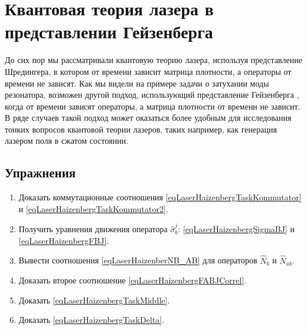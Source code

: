 \chapter{Квантовая теория лазера в представлении Гейзенберга}
\label{chLaser2}

До сих пор мы рассматривали квантовую теорию лазера, используя
представление Шредингера, в котором от времени зависит матрица
плотности, а операторы от времени не зависят. Как мы видели на примере
задачи о затухании моды резонатора, возможен другой подход,
использующий представление Гейзенберга
\cite{bScullyQuantumOptics2003}, 
когда от времени зависят
операторы, а матрица плотности 
от времени не зависит. В ряде случаев
такой подход может оказаться более удобным для исследования тонких
вопросов квантовой теории лазеров, таких например, как генерация
лазером поля в сжатом состоянии. 






\section{Упражнения}
\begin{enumerate}
\item Доказать коммутационные соотношения
  \eqref{eqLaserHaizenbergTaskKommutator} и \eqref{eqLaserHaizenbergTaskKommutator2}.
\item Получить уравнения движения оператора $\hat{\sigma}_b^j$: \eqref{eqLaserHaizenbergSigmaBJ} и 
\eqref{eqLaserHaizenbergFBJ}.
\item Вывести соотношения \eqref{eqLaserHaizenberNB_AB} для
  операторов $\hat{N}_b$ и $\hat{N}_{ab}$.
\item Доказать второе соотношение \eqref{eqLaserHaizenbergFABJCorrel}.
\item Доказать \eqref{eqLaserHaizenbergTaskMiddle}.
\item Доказать \eqref{eqLaserHaizenbergTaskDelta}.
\end{enumerate}

